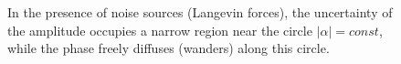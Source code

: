 \begin{figure}
\centering



\caption{In the presence of noise sources (Langevin forces), the uncertainty of the amplitude occupies a narrow region near the circle $\left|\alpha\right| = const$, while the phase freely diffuses (wanders) along this circle.}
\label{figPart2Laser2_3}
\end{figure}